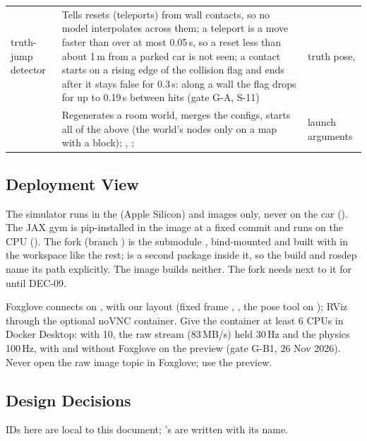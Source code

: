 \documentclass[11pt,a4paper]{article}
\newcommand{\planned}{\target{Planned}}
\begin{document}
\begin{tabularx}{\textwidth}{@{}L{3.2cm} L{4.6cm} Y@{}}
truth-jump detector & Tells resets (teleports) from wall contacts, so no model interpolates across them; a teleport is a move faster than  over at most 0.05\,s, so a reset less than about 1\,m from a parked car is not seen; a contact starts on a rising edge of the collision flag and ends after it stays false for 0.3\,s: along a wall the flag drops for up to 0.19\,s between hits (gate G-A, S-11) & truth pose,  \\
 & Regenerates a room world, merges the configs, starts all of the above (the world's nodes only on a map with a  block); , ;  \planned & launch arguments \\
\bottomrule
\end{tabularx}
\label{tab:components}

\subsection{Deployment View}
The simulator runs in the  (Apple Silicon) and  images only, never on the car (). The JAX gym is pip-installed in the image at a fixed commit and runs on the CPU (). The fork  (branch ) is the submodule , bind-mounted and built with  in the workspace like the rest;  is a second package inside it, so the build and rosdep name its path explicitly. The  image builds neither. The fork needs  next to it for  until DEC-09.

Foxglove connects on , with our layout  (fixed frame , , the pose tool on ); RViz through the optional noVNC container. Give the container at least 6 CPUs in Docker Desktop: with 10, the raw  stream (83\,MB/s) held 30\,Hz and the physics 100\,Hz, with and without Foxglove on the preview (gate G-B1, 26 Nov 2026). Never open the raw image topic in Foxglove; use the preview.

\subsection{Design Decisions}
IDs here are local to this document; 's are written with its name.
\end{document}
